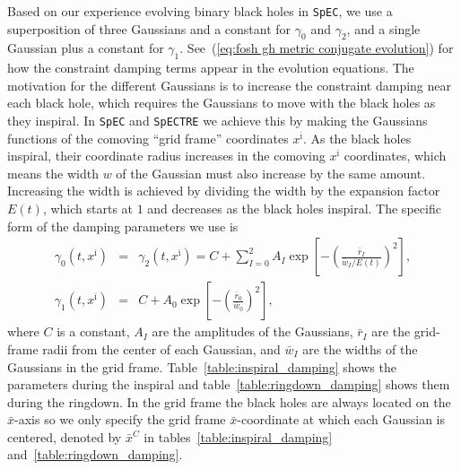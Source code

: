 \begin{bibunit}[unsrtnat]
Based on our experience evolving binary black holes in \texttt{SpEC}, we use a
superposition of three Gaussians and a constant for $\gamma_0$ and $\gamma_2$,
and a single Gaussian plus a constant for $\gamma_1$. See~(\ref{eq:fosh gh
  metric conjugate evolution}) for how the constraint damping terms appear in the
evolution equations. The motivation for the different Gaussians is to increase
the constraint damping near each black hole, which requires the Gaussians to
move with the black holes as they inspiral. In \texttt{SpEC} and
\texttt{SpECTRE} we achieve this by making the Gaussians functions of the
comoving ``grid frame'' coordinates $x^{\bar{\imath}}$. As the black holes
inspiral, their coordinate radius increases in the comoving $x^{\bar{\imath}}$
coordinates, which means the width $w$ of the Gaussian must also increase by the
same amount. Increasing the width is achieved by dividing the width by the
expansion factor $E(t)$, which starts at $1$ and decreases as the black holes
inspiral. The specific form of the damping parameters we use is
\begin{eqnarray}
  \label{eq:gamma_0_2_gaussian}
  \gamma_0(t, x^{\bar{\imath}})
  &=& \gamma_2(t, x^{\bar{\imath}}) = C
      + \sum_{I=0}^2 A_I
      \exp\left[-\left(\frac{\bar{r}_I}{\bar{w}_I
      / E(t)}\right)^2\right],\\
  \label{eq:gamma_1_gaussian}
  \gamma_1(t, x^{\bar{\imath}})
  &=& C + A_{0} \exp\left[-\left(\frac{\bar{r}_0}{\bar{w}_{0}}\right)^2\right],
\end{eqnarray}
where $C$ is a constant, $A_I$ are the amplitudes of the Gaussians, $\bar{r}_I$
are the grid-frame radii from the center of each Gaussian, and $\bar{w}_I$ are
the widths of the Gaussians in the grid
frame. Table~\ref{table:inspiral_damping} shows the parameters during the
inspiral and table~\ref{table:ringdown_damping} shows them during the
ringdown. In the grid frame the black holes are always located on the
$\bar{x}$-axis so we only specify the grid frame $\bar{x}$-coordinate at which
each Gaussian is centered, denoted by $\bar{x}^C$ in
tables~\ref{table:inspiral_damping} and~\ref{table:ringdown_damping}.


\end{bibunit}
